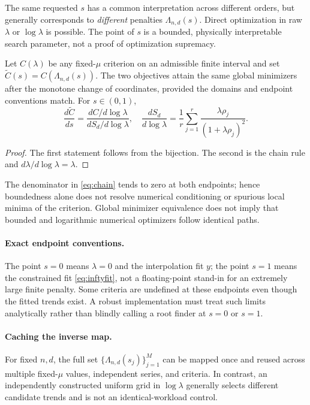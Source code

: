 The same requested $s$ has a common interpretation across different orders, but generally corresponds to \emph{different} penalties $\Lambda_{n,d}(s)$. Direct optimization in raw $\lambda$ or $\log\lambda$ is possible. The point of $s$ is a bounded, physically interpretable search parameter, not a proof of optimization supremacy.

\begin{proposition}\label{prop:coordinate}
Let $C(\lambda)$ be any fixed-$\mu$ criterion on an admissible finite interval and set $\widetilde C(s)=C(\Lambda_{n,d}(s))$. The two objectives attain the same global minimizers after the monotone change of coordinates, provided the domains and endpoint conventions match. For $s\in(0,1)$,
\begin{equation}\label{eq:chain}
\frac{d\widetilde C}{ds}
=\frac{dC/d\log\lambda}{dS_d/d\log\lambda},
\quad
\frac{dS_d}{d\log\lambda}
=\frac1r\sum_{j=1}^r\frac{\lambda\rho_j}
{(1+\lambda\rho_j)^2}.
\end{equation}
\end{proposition}
\begin{proof}
The first statement follows from the bijection. The second is the chain rule and $d\lambda/d\log\lambda=\lambda$.
\end{proof}
The denominator in \eqref{eq:chain} tends to zero at both endpoints; hence boundedness alone does not resolve numerical conditioning or spurious local minima of the criterion. Global minimizer equivalence does not imply that bounded and logarithmic numerical optimizers follow identical paths.

\paragraph{Exact endpoint conventions.}
The point $s=0$ means $\lambda=0$ and the interpolation fit $y$; the point $s=1$ means the constrained fit \eqref{eq:inftyfit}, not a floating-point stand-in for an extremely large finite penalty. Some criteria are undefined at these endpoints even though the fitted trends exist. A robust implementation must treat such limits analytically rather than blindly calling a root finder at $s=0$ or $s=1$.

\paragraph{Caching the inverse map.}
For fixed $n,d$, the full set $\{\Lambda_{n,d}(s_j)\}_{j=1}^M$ can be mapped once and reused across multiple fixed-$\mu$ values, independent series, and criteria. In contrast, an independently constructed uniform grid in $\log\lambda$ generally selects different candidate trends and is not an identical-workload control.

